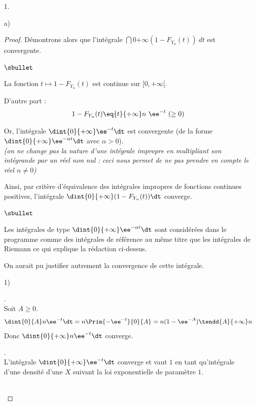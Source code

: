 \documentclass[11pt]{article}%
\begin{document}
\begin{noliste}{1.}
\begin{noliste}{a)}
\begin{proof}
      \noindent Démontrons alors que l'intégrale $\dint{0}{+ \infty}
      \left(1-F_{Y_{n}}(t) \right) \ dt$ est convergente.
      \begin{noliste}{$\sbullet$}       
      \item La fonction $t\mapsto 1-F_{Y_n}(t)$ est continue sur
        $[0,+\infty[$.
      \item D'autre part :
        \[
        1-F_{Y_n}(t) \eq{t}{+\infty} n\ \ee^{-t} \ (\geq 0)
        \]
      \item Or, l'intégrale $\dint{0}{+\infty} \ee^{-t} \dt$ est
        convergente (de la forme $\dint{0}{+\infty} \ee^{- \alpha t}
        \dt$ avec $\alpha > 0$).\\
        {\it (on ne change pas la nature d'une intégrale impropre en
          multipliant son intégrande par un réel non nul : ceci nous
          permet de ne pas prendre en compte le réel $n \neq 0$)}
      \end{noliste}
      Ainsi, par critère d'équivalence des intégrales impropres de
      fonctions continues positives, l'intégrale $\dint{0}{+\infty}
      (1-F_{Y_n}(t))\dt$ converge.%
      ~\\[-.8cm]
      \begin{remark}%
        \begin{noliste}{$\sbullet$}
        \item Les intégrales de type $\dint{0}{+\infty} \ee^{- \alpha
            t} \dt$ sont considérées dans le programme comme des
          intégrales de référence au même titre que les intégrales de
          Riemann ce qui explique la rédaction ci-dessus.
        \item On aurait pu justifier autrement la convergence de cette
          intégrale.
          \begin{noliste}{1)}
          \item {}.\\
            Soit $A\geq 0$.
            \[
            \dint{0}{A} n\ee^{-t}\dt = n\Prim{-\ee^{-t}}{0}{A}=
            n(1-\ee^{-A}) \tendd{A}{+\infty} n
            \]
            Donc $\dint{0}{+\infty} n\ee^{-t} \dt$ converge.

          \item {}.\\
            L'intégrale $\dint{0}{+\infty} \ee^{- t} \dt$ converge et
            vaut $1$ en tant qu'intégrale d'une densité d'une \var $X$
            suivant la loi exponentielle de paramètre $1$.
          \end{noliste}
        \end{noliste}
      \end{remark}~\\[-1.4cm]
    \end{proof}
      

\end{noliste}
\end{noliste}
\end{document}
